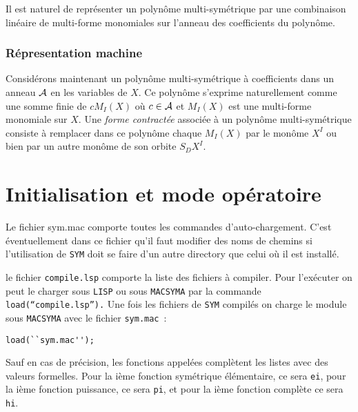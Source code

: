 Il est naturel de repr\'esenter un polyn\^ome multi-sym\'etrique par une
combinaison lin\'eaire de multi-forme monomiales sur l'anneau des
coefficients du polyn\^ome.
\subsubsection*{R\'epresentation machine}
Consid\'erons maintenant un polyn\^ome multi-sym\'etrique \`a
coefficients dans un anneau $\cal A$ en les variables de $X$. 
Ce polyn\^ome s'exprime naturellement comme
une somme finie de $cM_I(X)$ o\`u $c \in {\cal A}$ et $M_I(X)$ est une
multi-forme monomiale sur $X$. Une {\it forme contract\'ee}
associ\'ee \`a un polyn\^ome multi-sym\'etrique
consiste \`a remplacer dans ce polyn\^ome chaque $M_I(X)$ par le mon\^ome 
$X^I$ ou bien par un autre mon\^ome de son orbite $S_DX^I$.

\section{Initialisation et mode op\'eratoire}

Le fichier sym.mac comporte toutes les commandes d'auto-chargement. C'est
\'eventuellement dans ce fichier qu'il faut modifier des noms de chemins si
l'utilisation de {\tt SYM} doit se faire d'un autre directory que celui
o\`u il est install\'e.

le fichier {\tt compile.lsp} comporte la liste des fichiers \`a
compiler. Pour l'ex\'ecuter on peut le charger sous {\tt LISP} ou sous
{\tt MACSYMA}
par la commande {\tt load(``compile.lsp'').} 
Une fois les fichiers de {\tt SYM} compil\'es on charge le module sous
{\tt MACSYMA} avec le fichier {\tt sym.mac}~: 
\begin{verbatim}
load(``sym.mac'');
\end{verbatim}

Sauf en cas de pr\'{e}cision, les fonctions appel\'{e}es compl\`{e}tent les
listes avec des valeurs formelles.
Pour la i\`{e}me fonction sym\'{e}trique \'{e}l\'{e}mentaire, ce sera {\tt ei},
pour la i\`{e}me fonction puissance, ce sera {\tt pi}, et pour la i\`{e}me 
fonction compl\`ete  ce sera {\tt hi}.\\

